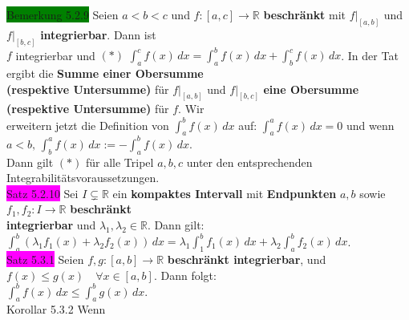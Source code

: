 \documentclass[10pt]{article}
\begin{document}
\colorbox{green}{Bemerkung 5.2.9} Seien \textcolor{NavyBlue}{$a<b<c$} und 
                \textcolor{NavyBlue}{$f:[a,c]\longrightarrow\mathbb{R}$} 
                \textbf{beschränkt} mit 
                \textcolor{NavyBlue}{$f|_{[a,b]}$} und \textcolor{NavyBlue}{$f|_{[b,c]}$} 
                \textbf{integrierbar}. Dann ist \\
        \indent \textcolor{NavyBlue}{$f$} integrierbar und 
                $(*)$ 
                \textcolor{NavyBlue}{$\int_a^cf(x)\,dx=\int_a^bf(x)\,dx+\int_b^cf(x)\,dx$}.
                In der Tat ergibt die \textbf{Summe einer Obersumme \\
        \indent (respektive Untersumme)} für 
                \textcolor{NavyBlue}{$f|_{[a,b]}$} und \textcolor{NavyBlue}{$f|_{[b,c]}$} 
                \textbf{eine Obersumme (respektive Untersumme)} für 
                \textcolor{NavyBlue}{$f$}. Wir\\
        \indent erweitern jetzt die Definition von \textcolor{NavyBlue}{$\int_a^bf(x)\,dx$} auf: 
                \textcolor{NavyBlue}{$\int_a^af(x)\,dx=0$} und wenn 
                \textcolor{NavyBlue}{$a<b,\,\int_b^af(x)\,dx:=-\int_a^bf(x)\,dx$}.\\
        \indent Dann gilt $(*)$ für alle Tripel \textcolor{NavyBlue}{$a,b,c$} unter den 
                entsprechenden Integrabilitätsvoraussetzungen. \\
\colorbox{magenta}{Satz 5.2.10} Sei \textcolor{NavyBlue}{$I\subsetneq\mathbb{R}$} 
                ein \textbf{kompaktes Intervall} 
                mit \textbf{Endpunkten} \textcolor{NavyBlue}{$a,b$} sowie 
                \textcolor{NavyBlue}{$f_1,f_2:I\longrightarrow\mathbb{R}$}
                \textbf{beschränkt \\
        \indent integrierbar} und \textcolor{NavyBlue}{$\lambda_1,\lambda_2\in\mathbb{R}$}. 
                Dann gilt: 
                \textcolor{NavyBlue}{$\int_a^b(\lambda_1f_1(x)+\lambda_2f_2(x))\,dx
                =\lambda_1\int_1^bf_1(x)\,dx+\lambda_2\int_a^bf_2(x)\,dx$}. \\
\colorbox{magenta}{Satz 5.3.1} Seien \textcolor{NavyBlue}{$f,g:[a,b]\longrightarrow\mathbb{R}$}
                \textbf{beschränkt integrierbar}, und 
                \textcolor{NavyBlue}{$f(x)\leqslant g(x)\quad\forall x\in[a,b]$}.
                Dann folgt: \\
        \indent \textcolor{NavyBlue}{$\int_a^bf(x)\,dx\leqslant\int_a^bg(x)\,dx$}. \\
\colorbox{BurntOrange}{Korollar 5.3.2} Wenn 
\end{document}
